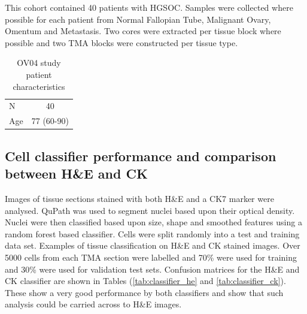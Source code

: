 This cohort contained 40 patients with HGSOC. Samples were collected where possible for each patient from Normal Fallopian Tube, Malignant Ovary, Omentum and Metastasis. Two cores were extracted per tissue block where possible and two TMA blocks were constructed per tissue type.

\begin{table}[]
    \centering
    \begin{tabular}{lc}
    \hline
       N  &  40 \\
        Age &  77 (60-90)
    \hline
    \end{tabular}
    \caption{OV04 study patient characteristics}
    \label{tab:OV04_patient}
\end{table}


\subsection{Cell classifier performance and comparison between H\&E and CK}

Images of tissue sections stained with both H\&E and a CK7 marker were analysed. QuPath was used to segment nuclei based upon their optical density. Nuclei were then classified based upon size, shape and smoothed features using a random forest based classifier. Cells were split randomly into a test and training data set. Examples of tissue classification on H\&E and CK stained images. Over 5000 cells from each TMA section were labelled and 70\% were used for training and 30\% were used for validation test sets. Confusion matrices for the H\&E and CK classifier are shown in Tables (\ref{tab:classifier_he} and \ref{tab:classifier_ck}). These show a very good performance by both classifiers and show that such analysis could be carried across to H\&E images.


